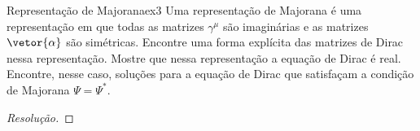 \begin{exercício}{Representação de Majorana}{ex3}
    Uma representação de Majorana é uma representação em que todas as matrizes \(\gamma^\mu\) são imaginárias e as matrizes \(\vetor{\alpha}\) são simétricas. Encontre uma forma explícita das matrizes de Dirac nessa representação. Mostre que nessa representação a equação de Dirac é real. Encontre, nesse caso, soluções para a equação de Dirac que satisfaçam a condição de Majorana \(\Psi = \Psi^*\).
\end{exercício}
\begin{proof}[Resolução]
    
\end{proof}
